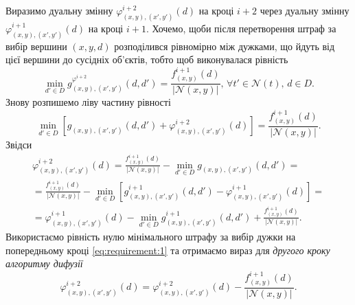 Виразимо дуальну змінну
$\varphi_{\left(x, y \right), \left(x', y' \right)}^{i + 2} \left( d \right)$
на кроці $i + 2$ через дуальну змінну
$\varphi_{\left(x, y \right), \left(x', y' \right)}^{i + 1} \left( d \right)$
на кроці $i + 1$.
Хочемо, щоби після перетворення штраф за вибір вершини $\left(x, y, d \right)$
розподілився рівномірно між дужками,
що йдуть від цієї вершини до сусідніх об'єктів, тобто щоб виконувалася рівність
\begin{equation*}
    \min \limits_{d' \in D} g_{\left(x, y \right), \left(x', y' \right)}^{\varphi^{i + 2}}
    \left(
        d, d'
    \right) =
    \frac{f_{\left(x, y \right)}^{i + 1} \left(d \right)}{\left| \mathcal{N} \left( x, y \right) \right|}, \,
    \forall t' \in \mathcal{N} \left(t \right), \,
    d \in D.
\end{equation*}
Знову розпишемо ліву частину рівності
\begin{equation*}
    \min \limits_{d' \in D} \left[
        g_{\left(x, y \right), \left(x', y' \right)} \left( d, d' \right) +
        \varphi_{\left(x, y \right), \left(x', y' \right)}^{i + 2} \left(d \right)
    \right] =
    \frac{f_{\left(x, y \right)}^{i + 1} \left(d \right)}{\left| \mathcal{N} \left( x, y \right) \right|}.
\end{equation*}
Звідси
\begin{equation*}
\begin{gathered}
    \varphi_{\left(x, y \right), \left(x', y' \right)}^{i + 2} \left(d \right) =
    \frac{f_{\left(x, y \right)}^{i + 1} \left(d \right)}{\left| \mathcal{N} \left( x, y \right) \right|} -
    \min \limits_{d' \in D}
        g_{\left(x, y \right), \left(x', y' \right)} \left( d, d' \right) = \\
    = \frac{f_{\left(x, y \right)}^{i + 1} \left(d \right)}{\left| \mathcal{N} \left( x, y \right) \right|} -
    \min \limits_{d' \in D} \left[
        g_{\left(x, y \right), \left(x', y' \right)}^{i + 1} \left( d, d' \right) -
        \varphi_{\left(x, y \right), \left(x', y' \right)}^{i + 1} \left(d \right)
    \right] = \\
    = \varphi_{\left(x, y \right), \left(x', y' \right)}^{i + 1} \left(d \right) -
    \min \limits_{d' \in D}
        g_{\left(x, y \right), \left(x', y' \right)}^{i + 1} \left( d, d' \right) +
    \frac{f_{\left(x, y \right)}^{i + 1} \left(d \right)}{\left| \mathcal{N} \left( x, y \right) \right|}.
\end{gathered}
\end{equation*}
Використаємо рівність нулю
мінімального штрафу за вибір дужки на попередньому кроці
\eqref{eq:requirement:1}
та отримаємо вираз для \textit{другого кроку алгоритму дифузії}
\begin{equation*}
    \varphi_{\left(x, y \right), \left(x', y' \right)}^{i + 2} \left(d \right) =
    \varphi_{\left(x, y \right), \left(x', y' \right)}^{i + 2} \left(d \right) -
    \frac{f_{\left(x, y \right)}^{i + 1} \left(d \right)}{\left| \mathcal{N} \left( x, y \right) \right|}.
\end{equation*}

